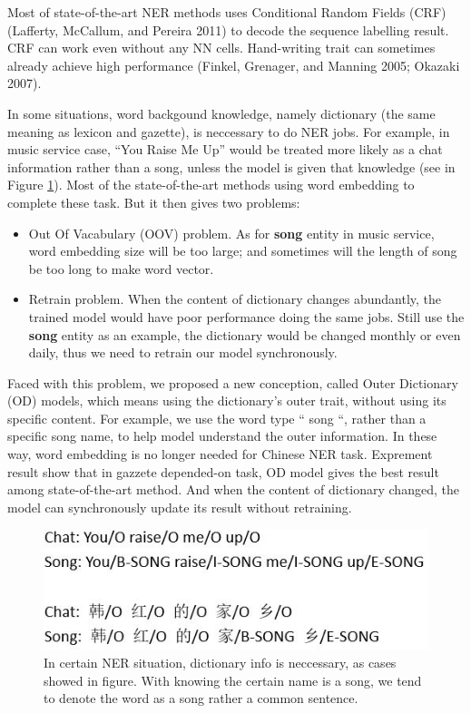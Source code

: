 \documentclass[letterpaper]{article} %
\begin{document}
Most of state-of-the-art NER methods uses Conditional Random Fields (CRF) (Lafferty, McCallum, and Pereira 2011) to decode the sequence labelling result. CRF can work even without any NN cells. Hand-writing trait can sometimes already achieve high performance (Finkel, Grenager, and Manning 2005; Okazaki 2007). 

In some situations, word backgound knowledge, namely dictionary (the same meaning as lexicon and gazette), is neccessary to do NER jobs. For example, in music service case, “You Raise Me Up'' would be treated more likely as a chat information rather than a song, unless the model is given that knowledge (see in Figure \ref{fig1}). Most of the state-of-the-art methods using word embedding to complete these task. But it then gives two problems: 

\begin{itemize}
\item Out Of Vacabulary (OOV) problem. As for \textbf{song} entity in music service, word embedding size will be too large; and sometimes will the length of song be too long to make word vector. 
\item Retrain problem. When the content of dictionary changes abundantly, the trained model would have poor performance doing the same jobs. Still use the \textbf{song} entity as an example, the dictionary would be changed monthly or even daily, thus we need to retrain our model synchronously. 
\end{itemize}

Faced with this problem, we proposed a new conception, called Outer Dictionary (OD) models, which means using the dictionary's outer trait, without using its specific content. For example, we use the word type `` song ``, rather than a specific song name, to help model understand the outer information. In these way, word embedding is no longer needed for Chinese NER task. Exprement result show that in gazzete depended-on task, OD model gives the best result among state-of-the-art method. And when the content of dictionary changed, the model can synchronously update its result without retraining.

\begin{figure}[t]
\centering
\includegraphics[width=0.9\columnwidth]{gazzete_is_needed} %
\caption{In certain NER situation, dictionary info is neccessary, as cases showed in figure. With knowing the certain name is a song, we tend to denote the word as a song rather a common sentence.}
\label{fig1}
\end{figure}
\end{document}
